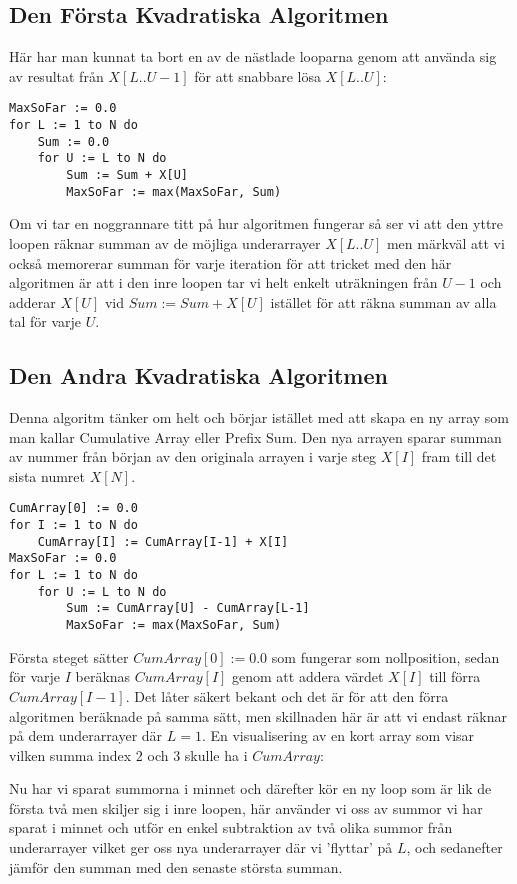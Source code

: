 \documentclass[a4paper,12pt]{article}
\begin{document}
\subsection*{Den Första Kvadratiska Algoritmen}
\label{sec:kvadratisk1}
Här har man kunnat ta bort en av de nästlade looparna genom att använda sig av
resultat från $X[L..U - 1]$ för att snabbare lösa $X[L..U]$:
\begin{verbatim}
MaxSoFar := 0.0
for L := 1 to N do
    Sum := 0.0
    for U := L to N do
        Sum := Sum + X[U]
        MaxSoFar := max(MaxSoFar, Sum)
\end{verbatim}
Om vi tar en noggrannare titt på hur algoritmen fungerar så ser vi att den
yttre loopen räknar summan av de möjliga underarrayer $X[L..U]$ men märkväl att
vi också memorerar summan för varje iteration för att tricket med den här
algoritmen är att i den inre loopen tar vi helt enkelt uträkningen från $U - 1$
och adderar $X[U]$ vid $Sum := Sum + X[U]$ istället för att räkna summan av
alla tal för varje $U$.
%
\subsection*{Den Andra Kvadratiska Algoritmen}
\label{sec:kvadratisk2}
Denna algoritm tänker om helt och börjar istället med att skapa en ny array som
man kallar Cumulative Array eller Prefix Sum. Den nya arrayen sparar summan av
nummer från början av den originala arrayen i varje steg $X[I]$ fram till det
sista numret $X[N]$.
\begin{verbatim}
CumArray[0] := 0.0
for I := 1 to N do
    CumArray[I] := CumArray[I-1] + X[I]
MaxSoFar := 0.0
for L := 1 to N do
    for U := L to N do
        Sum := CumArray[U] - CumArray[L-1]
        MaxSoFar := max(MaxSoFar, Sum)
\end{verbatim}
Första steget sätter $CumArray[0] := 0.0$ som fungerar som nollposition, sedan
för varje $I$ beräknas $CumArray[I]$ genom att addera värdet $X[I]$ till förra
$CumArray[I - 1]$. Det låter säkert bekant och det är för att den förra
algoritmen beräknade på samma sätt, men skillnaden här är att vi endast räknar
på dem underarrayer där $L = 1$. En visualisering av en kort array som visar
vilken summa index $2$ och $3$ skulle ha i $CumArray$:
\begin{center}
\end{center}
Nu har vi sparat summorna i minnet och därefter kör en ny loop som är lik de
första två men skiljer sig i inre loopen, här använder vi oss av summor vi har
sparat i minnet och utför en enkel subtraktion av två olika summor från
underarrayer vilket ger oss nya underarrayer där vi 'flyttar' på $L$, och
sedanefter jämför den summan med den senaste största summan.
%
\end{document}
